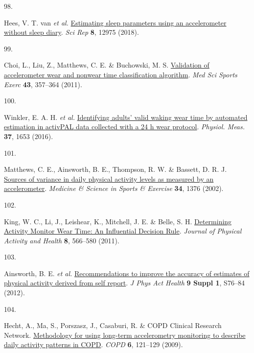 \documentclass[
  10pt,
]{scrbook}
\newlength{\cslhangindent}
\newlength{\csllabelwidth}
\newlength{\cslentryspacingunit} %
\newenvironment{CSLReferences}[2] %
 {%
  \setlength{\parindent}{0pt}
  \ifodd #1
  \let\oldpar\par
  \def\par{\hangindent=\cslhangindent\oldpar}
  \fi
  \setlength{\parskip}{#2\cslentryspacingunit}
 }%
 {}
\newcommand{\CSLLeftMargin}[1]{\parbox[t]{\csllabelwidth}{#1}}
\newcommand{\CSLRightInline}[1]{\parbox[t]{\linewidth - \csllabelwidth}{#1}\break}
\let\originaltextbf\textbf
\renewcommand{\textbf}[1]{\textcolor{color1}{\textsf{\originaltextbf{#1}}}}
\begin{document}
\begin{CSLReferences}{0}{0}
\leavevmode{}%
\CSLLeftMargin{98. }%
\CSLRightInline{Hees, V. T. van \emph{et al.}
\href{https://doi.org/10.1038/s41598-018-31266-z}{Estimating sleep
parameters using an accelerometer without sleep diary}. \emph{Sci Rep}
\textbf{8}, 12975 (2018).}

\leavevmode{}%
\CSLLeftMargin{99. }%
\CSLRightInline{Choi, L., Liu, Z., Matthews, C. E. \& Buchowski, M. S.
\href{https://doi.org/10.1249/MSS.0b013e3181ed61a3}{Validation of
accelerometer wear and nonwear time classification algorithm}. \emph{Med
Sci Sports Exerc} \textbf{43}, 357--364 (2011).}

\leavevmode{}%
\CSLLeftMargin{100. }%
\CSLRightInline{Winkler, E. A. H. \emph{et al.}
\href{https://doi.org/10.1088/0967-3334/37/10/1653}{Identifying adults'
valid waking wear time by automated estimation in {activPAL} data
collected with a 24 h wear protocol}. \emph{Physiol. Meas.} \textbf{37},
1653 (2016).}

\leavevmode{}%
\CSLLeftMargin{101. }%
\CSLRightInline{Matthews, C. E., Ainsworth, B. E., Thompson, R. W. \&
Bassett, D. R. J.
\href{https://journals.lww.com/acsm-msse/fulltext/2002/08000/sources_of_variance_in_daily_physical_activity.21.aspx}{Sources
of variance in daily physical activity levels as measured by an
accelerometer}. \emph{Medicine \& Science in Sports \& Exercise}
\textbf{34}, 1376 (2002).}

\leavevmode{}%
\CSLLeftMargin{102. }%
\CSLRightInline{King, W. C., Li, J., Leishear, K., Mitchell, J. E. \&
Belle, S. H. \href{https://doi.org/10.1123/jpah.8.4.566}{Determining
Activity Monitor Wear Time: An Influential Decision Rule}. \emph{Journal
of Physical Activity and Health} \textbf{8}, 566--580 (2011).}

\leavevmode{}%
\CSLLeftMargin{103. }%
\CSLRightInline{Ainsworth, B. E. \emph{et al.}
\href{https://doi.org/10.1123/jpah.9.s1.s76}{Recommendations to improve
the accuracy of estimates of physical activity derived from self
report}. \emph{J Phys Act Health} \textbf{9 Suppl 1}, S76--84 (2012).}

\leavevmode{}%
\CSLLeftMargin{104. }%
\CSLRightInline{Hecht, A., Ma, S., Porszasz, J., Casaburi, R. \& COPD
Clinical Research Network.
\href{https://doi.org/10.1080/15412550902755044}{Methodology for using
long-term accelerometry monitoring to describe daily activity patterns
in {COPD}}. \emph{{COPD}} \textbf{6}, 121--129 (2009).}


\end{CSLReferences}
\end{document}
